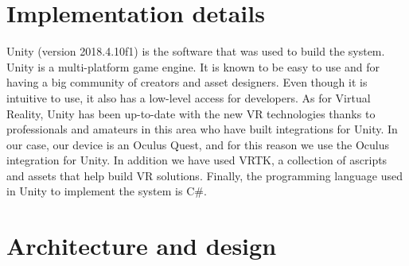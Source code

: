 \section{Implementation details}
Unity (version 2018.4.10f1\cite{unity2018}) is the software that was used to build the system. Unity is a multi-platform game engine. It is known to be easy to use and for having a big community of creators and asset designers\cite{developing_vr_unity}. Even though it is intuitive to use, it also has a low-level access for developers. As for Virtual Reality, Unity has been up-to-date with the new VR technologies thanks to professionals and amateurs in this area who have built integrations for Unity. In our case, our device is an Oculus Quest, and for this reason we use the Oculus integration for Unity\cite{oculus_unity_integration}. In addition we have used VRTK, a collection of ascripts and assets that help build VR solutions\cite{vrtk_what}. Finally, the programming language used in Unity to implement the system is C\#.

\section{Architecture and design}
